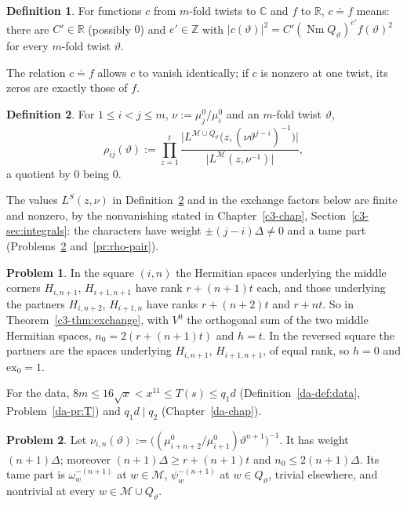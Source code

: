 \documentclass[reqno]{amsart}
\newcounter{chap}
\theoremstyle{definition}
\newtheorem{problem}{Problem}[section]
\newtheorem{definition}{Definition}[section]
\theoremstyle{plain}
\newcommand{\Z}{\mathbb Z}
\newcommand{\R}{\mathbb R}
\newcommand{\C}{\mathbb C}
\newcommand{\Nm}{\operatorname{Nm}}
\newcommand{\cM}{\mathcal M}
\newcommand{\ex}{\mathrm{ex}}
\begin{document}
\begin{definition}\label{def:doteq}
For functions \(c\) from \(m\)-fold twists to \(\C\) and \(f\) to \(\R\), \(c \doteq f\) means: there are \(C' \in \R\) (possibly \(0\)) and \(e' \in \Z\) with \(\lvert c(\vartheta)\rvert^2 = C'(\Nm Q_\vartheta)^{e'} f(\vartheta)^2\) for every \(m\)-fold twist \(\vartheta\).
\end{definition}

The relation \(c \doteq f\) allows \(c\) to vanish identically; if \(c\) is nonzero at one twist, its zeros are exactly those of \(f\).

\begin{definition}\label{def:rho}
For \(1 \le i < j \le m\), \(\nu := \mu_j^0/\mu_i^0\) and an \(m\)-fold twist \(\vartheta\),
\[
  \rho_{ij}(\vartheta) := \prod_{z=1}^{t} \frac{\lvert L^{\cM \cup Q_\vartheta}\bigl(z, (\nu\vartheta^{j-i})^{-1}\bigr)\rvert}{\lvert L^{\cM}(z, \nu^{-1})\rvert} ,
\]
a quotient by \(0\) being \(0\).
\end{definition}

The values \(L^S(z, \nu)\) in Definition~\ref{def:rho} and in the exchange factors below are finite and nonzero, by the nonvanishing stated in Chapter~\ref{c3-chap}, Section~\ref{c3-sec:integrals}: the characters have weight \(\pm(j-i)\Delta \ne 0\) and a tame part (Problems~\ref{pr:square-char} and~\ref{pr:rho-pair}).

\begin{problem}\label{pr:square-ranks}
In the square \((i,n)\) the Hermitian spaces underlying the middle corners \(H_{i,n+1}\), \(H_{i+1,n+1}\) have rank \(r + (n+1)t\) each, and those underlying the partners \(H_{i,n+2}\), \(H_{i+1,n}\) have ranks \(r + (n+2)t\) and \(r + nt\).  So in Theorem~\ref{c3-thm:exchange}, with \(V^0\) the orthogonal sum of the two middle Hermitian spaces, \(n_0 = 2(r + (n+1)t)\) and \(h = t\).  In the reversed square the partners are the spaces underlying \(H_{i,n+1}\), \(H_{i+1,n+1}\), of equal rank, so \(h = 0\) and \(\ex_0 = 1\).
\end{problem}

For the data, \(8m \le 16\sqrt x < x^{11} \le T(s) \le q_1 d\) (Definition~\ref{da-def:data}, Problem~\ref{da-pr:T}) and \(q_1 d \mid q_2\) (Chapter~\ref{da-chap}).

\begin{problem}\label{pr:square-char}
Let \(\nu_{i,n}(\vartheta) := \bigl((\mu^0_{i+n+2}/\mu^0_{i+1})\vartheta^{n+1}\bigr)^{-1}\).  It has weight \((n+1)\Delta\); moreover \((n+1)\Delta \ge r + (n+1)t\) and \(n_0 \le 2(n+1)\Delta\).  Its tame part is \(\omega_w^{-(n+1)}\) at \(w \in \cM\), \(\psi_w^{-(n+1)}\) at \(w \in Q_\vartheta\), trivial elsewhere, and nontrivial at every \(w \in \cM \cup Q_\vartheta\).
\end{problem}
\end{document}
